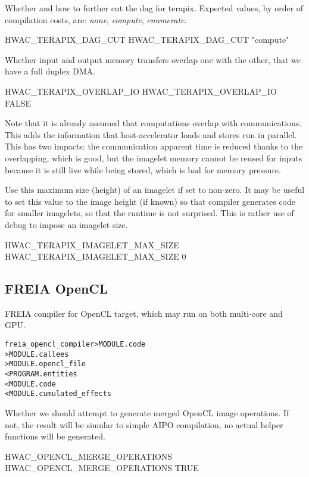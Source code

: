 \documentclass[a4paper]{report}
\newenvironment{PipsMake}{\begin{alltt}}{\end{alltt}}
\begin{document}
Whether and how to further cut the dag for terapix.
Expected values, by order of compilation costs, are:
\emph{none}, \emph{compute}, \emph{enumerate}.
\begin{PipsProp}{HWAC_TERAPIX_DAG_CUT}
HWAC_TERAPIX_DAG_CUT "compute"
\end{PipsProp}

Whether input and output memory transfers overlap one with the other,
that we have a full duplex DMA.
\begin{PipsProp}{HWAC_TERAPIX_OVERLAP_IO}
HWAC_TERAPIX_OVERLAP_IO FALSE
\end{PipsProp}
Note that it is already assumed that computations overlap with
communications. This adds the information that host-accelerator
loads and stores run in parallel. This has two impacts: the
communication apparent time is reduced thanks to the overlapping,
which is good, but the imagelet memory cannot be reused for inputs
because it is still live while being stored, which is bad for
memory pressure.

Use this maximum size (height) of an imagelet if set to non-zero.
It may be useful to set this value to the image height (if known) so
that compiler generates code for smaller imagelets, so that the
runtime is not surprised. This is rather use of debug to impose
an imagelet size.
\begin{PipsProp}{HWAC_TERAPIX_IMAGELET_MAX_SIZE}
HWAC_TERAPIX_IMAGELET_MAX_SIZE 0
\end{PipsProp}

\subsection{FREIA OpenCL}
\label{hwac-freia-opencl}

FREIA compiler for OpenCL target, which may run on both multi-core and GPU.

\begin{PipsMake}
freia_opencl_compiler  > MODULE.code
                       > MODULE.callees
                       > MODULE.opencl_file
        < PROGRAM.entities
        < MODULE.code
        < MODULE.cumulated_effects
\end{PipsMake}

Whether we should attempt to generate merged OpenCL image operations.
If not, the result will be simular to simple AIPO compilation,
no actual helper functions will be generated.
\begin{PipsProp}{HWAC_OPENCL_MERGE_OPERATIONS}
HWAC_OPENCL_MERGE_OPERATIONS TRUE
\end{PipsProp}
\end{document}
